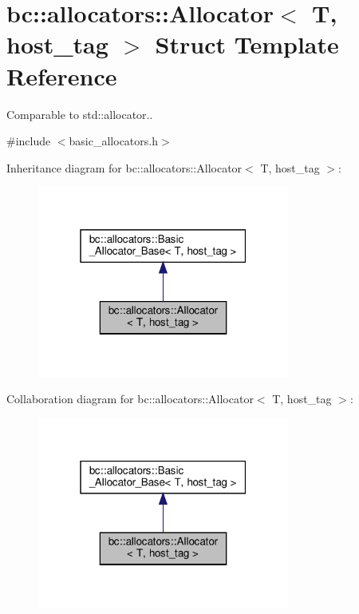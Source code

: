 \hypertarget{structbc_1_1allocators_1_1Allocator_3_01T_00_01host__tag_01_4}{}\section{bc\+:\+:allocators\+:\+:Allocator$<$ T, host\+\_\+tag $>$ Struct Template Reference}
\label{structbc_1_1allocators_1_1Allocator_3_01T_00_01host__tag_01_4}


Comparable to \textquotesingle{}std\+::allocator.\textquotesingle{}.  




{\ttfamily \#include $<$basic\+\_\+allocators.\+h$>$}



Inheritance diagram for bc\+:\+:allocators\+:\+:Allocator$<$ T, host\+\_\+tag $>$\+:\nopagebreak
\begin{figure}[H]
\begin{center}
\leavevmode
\includegraphics[width=235pt]{structbc_1_1allocators_1_1Allocator_3_01T_00_01host__tag_01_4__inherit__graph}
\end{center}
\end{figure}


Collaboration diagram for bc\+:\+:allocators\+:\+:Allocator$<$ T, host\+\_\+tag $>$\+:\nopagebreak
\begin{figure}[H]
\begin{center}
\leavevmode
\includegraphics[width=235pt]{structbc_1_1allocators_1_1Allocator_3_01T_00_01host__tag_01_4__coll__graph}
\end{center}
\end{figure}
